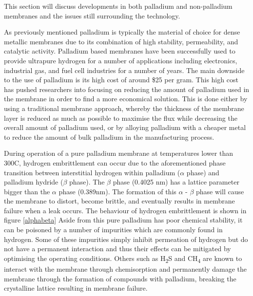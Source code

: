 This section will discuss developments in both palladium and non-palladium membranes and the issues still surrounding the technology.

As previously mentioned palladium is typically the material of choice for dense metallic 
membranes due to its combination of high stability, permeability, and catalytic activity. 
Palladium based membranes have been successfully used to provide ultrapure hydrogen for a 
number of applications including electronics, industrial gas, and fuel cell industries for a 
number of years. The main downside to the use of palladium is its high cost of around \$25 
per gram. \cite{JohnsomMattheyPreciousMetalsManagement2016} This high cost has pushed researchers into focusing on reducing the amount of 
palladium used in the membrane in order to find a more economical solution. This is done 
either by using a traditional membrane approach, whereby the thickness of the membrane layer 
is reduced as much as possible to maximise the flux while decreasing the overall amount of 
palladium used, or by alloying palladium with a cheaper metal to reduce the amount of bulk 
palladium in the manufacturing process. 

During operation of a pure palladium membrane at temperatures lower than 300\textdegree C, 
hydrogen embrittlement can occur due to the aforementioned phase transition between 
interstitial hydrogen within palladium ($\alpha$ phase) and palladium hydride ($\beta$ phase). 
The $\beta$ phase (0.4025 nm) has a lattice parameter bigger than the $\alpha$ phase 
(0.389nm). \cite{Flanagan1991}  The formation of this $\alpha$ - $\beta$ phase will cause the membrane to distort, 
become brittle, and eventually results in membrane failure when a leak occurs. \cite{Li2008b} The behaviour of hydrogen embrittlement is shown in figure \ref{alphabeta}
Aside from this pure palladium has poor chemical stability, it can be poisoned by a 
number of impurities which are commonly found in hydrogen. Some of these impurities 
simply inhibit permeation of hydrogen but do not have a permanent interaction and thus 
their effects can be mitigated by optimising the operating conditions. Others such as 
H\textsubscript{2}S and CH\textsubscript{4} are known to interact with the membrane through chemisorption and permanently 
damage the membrane through the formation of compounds with palladium, breaking the 
crystalline lattice resulting in membrane failure.  

